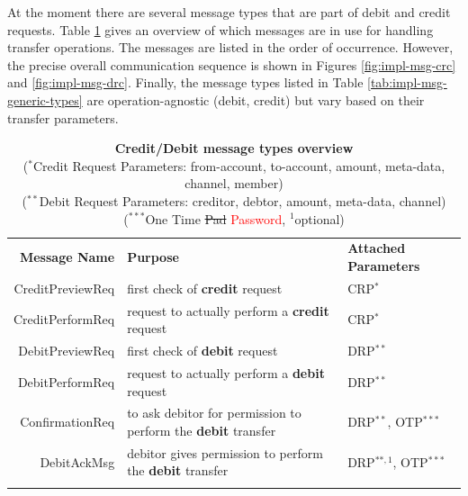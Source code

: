 At the moment there are several message types that are part of debit and credit requests. Table \ref{tab:impl-transfer-types} gives an overview of which messages are in use for handling transfer operations. The messages are listed in the order of occurrence. However, the precise overall communication sequence is shown in Figures \ref{fig:impl-msg-crc} and \ref{fig:impl-msg-drc}. Finally, the message types listed in Table \ref{tab:impl-msg-generic-types} are operation-agnostic (debit, credit) but vary based on their transfer parameters.

\begin{table}[H]
\begin{centering}
\small
{
\begin{tabular}{ r | p{7cm} | p{4cm} }
\hline
\textbf{Message Name} & \textbf{Purpose} & \textbf{Attached Parameters} \\
\Xhline{1.5pt}

CreditPreviewReq & first check of \textbf{credit} request & CRP$^{*}$ \\[3pt]
\hline
CreditPerformReq & request to actually perform a \textbf{credit} request & CRP$^{*}$ \\[3pt]
\Xhline{1.5pt}
DebitPreviewReq & first check of \textbf{debit} request & DRP$^{**}$ \\[3pt]
\hline
DebitPerformReq & request to actually perform a \textbf{debit} request & DRP$^{**}$ \\[3pt]
\hline
ConfirmationReq & to ask debitor for permission to perform the \textbf{debit} transfer & DRP$^{**}$, OTP$^{***}$ \\[3pt]
\hline
DebitAckMsg & debitor gives permission to perform the \textbf{debit} transfer & DRP$^{**, 1}$, OTP$^{***}$ \\[3pt]

\Xhline{1.5pt}
\end{tabular}
}
\caption{\small\textbf{Credit/Debit message types overview}\\
($^{*}$Credit Request Parameters: from-account, to-account, amount, meta-data, channel, member)\\
($^{**}$Debit Request Parameters:  creditor, debtor, amount, meta-data, channel)\\
($^{***}$One Time \st{Pad} \textcolor{red}{Password}, $^1$optional)}
\label{tab:impl-transfer-types}
\end{centering}
\vspace{-0.5cm}
\end{table}

